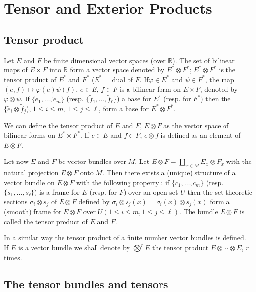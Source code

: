 \section{Tensor and Exterior Products}\label{sec3}

\subsection*{Tensor product}

Let $E$ and $F$ be finite dimensional vector spaces (over $\mathbb{R}$). The set of bilinear maps of $E\times F$ into $\mathbb{R}$ form a vector space denoted by $E^{*}\otimes F^{*}$; $E^{*}\otimes F^{*}$ is the tensor product of $E^{*}$ and $F^{*}$ ($E^{*}$ = dual of $F$. If\pageoriginale $\varphi\in E^{*}$ and $\psi\in F^{*}$, the map $(e,f)\mapsto \varphi(e)\psi(f)$, $e\in E$, $f\in F$ is a bilinear form on $E\times F$, denoted by $\varphi\otimes\psi$. If $\{\widetilde{e}_{1},\ldots,\widetilde{e}_{m}\}$ (resp. $\{\widetilde{f}_{1},\ldots,\widetilde{f}_{\ell}\}$) a base for $E^{*}$ (resp. for $F^{*}$) then the $\{\widetilde{e}_{i}\otimes \widetilde{f}_{j}$), $1\leq i\leq m$, $1\leq j\leq \ell$, form a base for $E^{*}\otimes F^{*}$.

We can define the tensor product of $E$ and $F$, $E\otimes F$ as the vector space of bilinear forms on $E^{*}\times F^{*}$. If $e\in E$ and $f\in F$, $e\otimes f$ is defined as an element of $E\otimes F$.

Let now $E$ and $F$ be vector bundles over $M$. Let $E\otimes F=\coprod\limits_{x\in M}E_{x}\otimes F_{x}$ with the natural projection $E\otimes F$ onto $M$. Then there exists a (unique) structure of a vector bundle on $E\otimes F$ with the following property : if $\{c_{1},\ldots,c_{m}\}$ (resp. $\{s_{1},\ldots,s_{\ell}\}$) is a frame for $E$ (resp. for $F$) over an open set $U$ then the set theoretic sections $\sigma_{i}\otimes s_{j}$ of $E\otimes F$ defined by $\sigma_{i}\otimes s_{j}(x)=\sigma_{i}(x)\otimes s_{j}(x)$ form a (smooth) frame for $E\otimes F$ over $U(1\leq i\leq m,1\leq j\leq \ell)$. The bundle $E\otimes F$ is called the tensor product of $E$ and $F$.

In a similar way the tensor product of a finite number vector bundles is defined. If $E$ is a vector bundle we shall denote by $\bigotimes\limits^{r} E$ the tensor product $E\otimes \cdots \otimes E$, $r$ times.

\subsection*{The tensor bundles and tensors}

